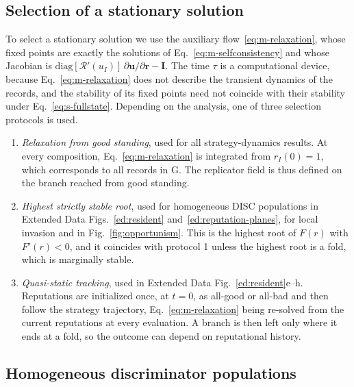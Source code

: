 \documentclass[10pt]{wlscirep}
\newcommand{\Rmap}{\mathscr{R}}            %
\theoremstyle{plain}
\theoremstyle{remark}
\begin{document}
\subsection{Selection of a stationary solution}

To select a stationary solution we use the auxiliary flow~\eqref{eq:m-relaxation}, whose fixed points are exactly the solutions of Eq.~\eqref{eq:m-selfconsistency} and whose Jacobian is $\mathrm{diag}[\Rmap'(u_I)]\,\partial\bm u/\partial\bm r-\mathbf I$. The time $\tau$ is a computational device, because Eq.~\eqref{eq:m-relaxation} does not describe the transient dynamics of the records, and the stability of its fixed points need not coincide with their stability under Eq.~\eqref{eq:s-fullstate}. Depending on the analysis, one of three selection protocols is used.
\begin{enumerate}
\item \textit{Relaxation from good standing}, used for all strategy-dynamics results. At every composition, Eq.~\eqref{eq:m-relaxation} is integrated from $r_I(0)=1$, which corresponds to all records in G. The replicator field is thus defined on the branch reached from good standing.
\item \textit{Highest strictly stable root}, used for homogeneous DISC populations in Extended Data Figs.~\ref{ed:resident} and~\ref{ed:reputation-planes}, for local invasion and in Fig.~\ref{fig:opportunism}. This is the highest root of $F(r)$ with $F'(r)<0$, and it coincides with protocol 1 unless the highest root is a fold, which is marginally stable.
\item \textit{Quasi-static tracking}, used in Extended Data Fig.~\ref{ed:resident}e--h. Reputations are initialized once, at $t=0$, as all-good or all-bad and then follow the strategy trajectory, Eq.~\eqref{eq:m-relaxation} being re-solved from the current reputations at every evaluation. A branch is then left only where it ends at a fold, so the outcome can depend on reputational history.
\end{enumerate}

\subsection{Homogeneous discriminator populations}
\label{si:resident}
\end{document}
